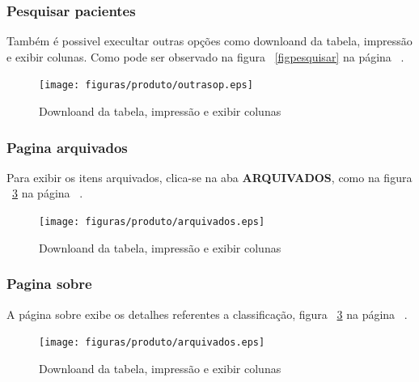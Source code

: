 \subsubsection{Pesquisar pacientes}
Também é possivel execultar outras opções como downloand da tabela, impressão e exibir colunas. Como pode ser observado na figura ~\ref{figpesquisar} na página ~\pageref{figpesquisar}.
\begin{figure}[!htb]
    \centering
    \texttt{[image: figuras/produto/outrasop.eps]}
    \caption{Downloand da tabela, impressão e exibir colunas}
    \label{figoutrasop}
\end{figure}

\subsubsection{Pagina arquivados}
Para exibir os itens arquivados, clica-se na aba \textbf{ARQUIVADOS}, como na figura ~\ref{farquivados} na página ~\pageref{farquivados}.
\begin{figure}[!htb]
    \centering
    \texttt{[image: figuras/produto/arquivados.eps]}
    \caption{Downloand da tabela, impressão e exibir colunas}
    \label{farquivados}
\end{figure}

\subsubsection{Pagina sobre}
A página sobre exibe os detalhes referentes a classificação, figura ~\ref{farquivados} na página ~\pageref{farquivados}.
\begin{figure}[!htb]
    \centering
    \texttt{[image: figuras/produto/arquivados.eps]}
    \caption{Downloand da tabela, impressão e exibir colunas}
    \label{farquivados}
\end{figure}